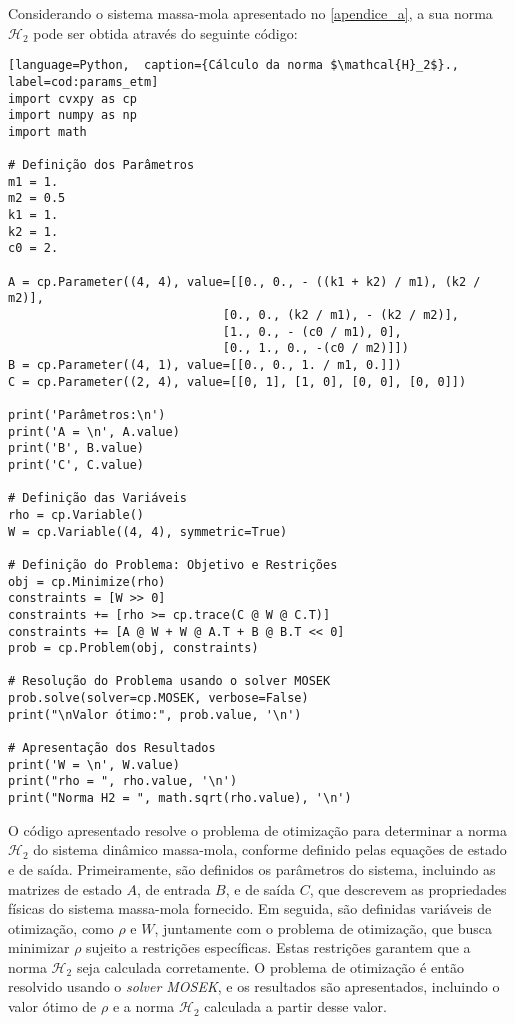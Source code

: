 Considerando o sistema massa-mola apresentado no \autoref{apendice_a}, a sua norma $\mathscr{H}_2$ pode ser obtida através do seguinte código: 

\vspace{8pt}
\begin{lstlisting}[language=Python,  caption={Cálculo da norma $\mathcal{H}_2$}., label=cod:params_etm]
import cvxpy as cp
import numpy as np
import math

# Definição dos Parâmetros
m1 = 1.
m2 = 0.5
k1 = 1.
k2 = 1.
c0 = 2.

A = cp.Parameter((4, 4), value=[[0., 0., - ((k1 + k2) / m1), (k2 / m2)],
                              [0., 0., (k2 / m1), - (k2 / m2)],
                              [1., 0., - (c0 / m1), 0],
                              [0., 1., 0., -(c0 / m2)]])
B = cp.Parameter((4, 1), value=[[0., 0., 1. / m1, 0.]])
C = cp.Parameter((2, 4), value=[[0, 1], [1, 0], [0, 0], [0, 0]])

print('Parâmetros:\n')
print('A = \n', A.value)
print('B', B.value)
print('C', C.value)

# Definição das Variáveis
rho = cp.Variable()
W = cp.Variable((4, 4), symmetric=True)

# Definição do Problema: Objetivo e Restrições
obj = cp.Minimize(rho)
constraints = [W >> 0]
constraints += [rho >= cp.trace(C @ W @ C.T)]
constraints += [A @ W + W @ A.T + B @ B.T << 0]
prob = cp.Problem(obj, constraints)

# Resolução do Problema usando o solver MOSEK
prob.solve(solver=cp.MOSEK, verbose=False)
print("\nValor ótimo:", prob.value, '\n')

# Apresentação dos Resultados
print('W = \n', W.value)
print("rho = ", rho.value, '\n')
print("Norma H2 = ", math.sqrt(rho.value), '\n')

\end{lstlisting}

O código apresentado resolve o problema de otimização para determinar a norma $\mathscr{H}_2$ do sistema dinâmico massa-mola, conforme definido pelas equações de estado e de saída. Primeiramente, são definidos os parâmetros do sistema, incluindo as matrizes de estado $A$, de entrada $B$, e de saída $C$, que descrevem as propriedades físicas do sistema massa-mola fornecido. Em seguida, são definidas variáveis de otimização, como $\rho$ e $W$, juntamente com o problema de otimização, que busca minimizar $\rho$ sujeito a restrições específicas. Estas restrições garantem que a norma $\mathscr{H}_2$ seja calculada corretamente. O problema de otimização é então resolvido usando o \textit{solver MOSEK}, e os resultados são apresentados, incluindo o valor ótimo de $\rho$ e a norma $\mathscr{H}_2$ calculada a partir desse valor. 



